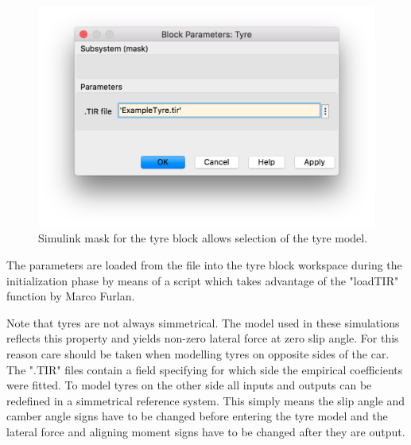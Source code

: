 \begin{figure}[ht]
    \centering
    \includegraphics[scale=0.5]{images/tyremask.png}
    \caption{Simulink mask for the tyre block allows selection of the tyre model.}
    \label{tyremask}
\end{figure}

The parameters are loaded from the file into the tyre block workspace during the initialization phase by means of a script which takes advantage of the "loadTIR" function by Marco Furlan\cite{loadtir}.

Note that tyres are not always simmetrical. The model used in these simulations reflects this property and yields non-zero lateral force at zero slip angle. For this reason care should be taken when modelling tyres on opposite sides of the car. The ".TIR" files contain a field specifying for which side the empirical coefficients were fitted. To model tyres on the other side all inputs and outputs can be redefined in a simmetrical reference system. This simply means the slip angle and camber angle signs have to be changed before entering the tyre model and the lateral force and aligning moment signs have to be changed after they are output.

